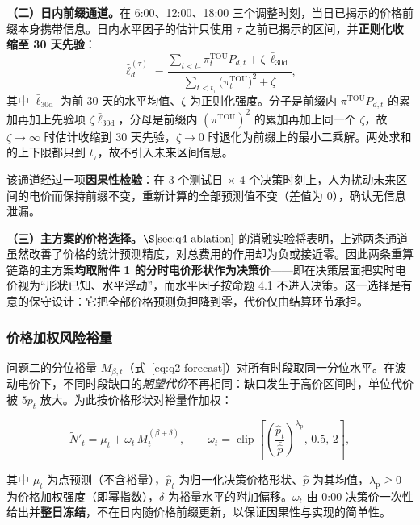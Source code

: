 \textbf{（二）日内前缀通道。}在 6:00、12:00、18:00 三个调整时刻，当日已揭示的价格前缀本身携带信息。日内水平因子的估计只使用 $\tau$ 之前已揭示的区间，并\textbf{正则化收缩至 30 天先验}：
\begin{equation}
  \hat\ell_{d}^{(\tau)}=\frac{\sum_{t<t_\tau}\pi_t^{\mathrm{TOU}}P_{d,t}+\zeta\,\bar\ell_{30\text{d}}}
  {\sum_{t<t_\tau}\!\bigl(\pi_t^{\mathrm{TOU}}\bigr)^{2}+\zeta},
  \label{eq:q4-prefix}
\end{equation}
其中 $\bar\ell_{30\text{d}}$ 为前 30 天的水平均值、$\zeta$ 为正则化强度。分子是前缀内 $\pi^{\mathrm{TOU}}P_{d,t}$ 的累加再加上先验项 $\zeta\bar\ell_{30\text{d}}$，分母是前缀内 $(\pi^{\mathrm{TOU}})^2$ 的累加再加上同一个 $\zeta$，故 $\zeta\to\infty$ 时估计收缩到 30 天先验，$\zeta\to0$ 时退化为前缀上的最小二乘解。两处求和的上下限都只到 $t_\tau$，故不引入未来区间信息。

该通道经过一项\textbf{因果性检验}：在 3 个测试日 $\times$ 4 个决策时刻上，人为扰动未来区间的电价而保持前缀不变，重新计算的全部预测值不变（差值为 0），确认无信息泄漏。

\textbf{（三）主方案的价格选择。}$\S\ref{sec:q4-ablation}$ 的消融实验将表明，上述两条通道虽然改善了价格的统计预测精度，对总费用的作用却为负或接近零。因此两条重算链路的主方案\textbf{均取附件 1 的分时电价形状作为决策价}——即在决策层面把实时电价视为``形状已知、水平浮动''，而水平因子按命题 4.1 不进入决策。这一选择是有意的保守设计：它把全部价格预测负担降到零，代价仅由结算环节承担。

\subsubsection{价格加权风险裕量}

问题二的分位裕量 $M_{\beta,t}$（式~\eqref{eq:q2-forecast}）对所有时段取同一分位水平。在波动电价下，不同时段缺口的\emph{期望代价}不再相同：缺口发生于高价区间时，单位代价被 $5p_t$ 放大。为此按价格形状对裕量作加权：

\begin{equation}
  \widetilde N'_t=\mu_t+\omega_t\,M_t^{(\beta+\delta)},\qquad
  \omega_t=\operatorname{clip}\!\left[\left(\frac{\hat p_t}{\bar{\hat p}}\right)^{\!\lambda_{\mathrm{p}}},\,0.5,\,2\right],
  \label{eq:q4-prm}
\end{equation}

其中 $\mu_t$ 为点预测（不含裕量），$\hat p_t$ 为归一化决策价格形状、$\bar{\hat p}$ 为其均值，$\lambda_{\mathrm{p}}\ge0$ 为价格加权强度（即幂指数），$\delta$ 为裕量水平的附加偏移。$\omega_t$ 由 0:00 决策价一次性给出并\textbf{整日冻结}，不在日内随价格前缀更新，以保证因果性与实现的简单性。

